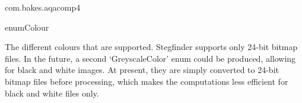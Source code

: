 \begin{texdocpackage}{com.bakes.aqacomp4}
\label{texdoclet:com.bakes.aqacomp4}

\begin{texdocclass}{enum}{Colour}
\label{texdoclet:com.bakes.aqacomp4.Colour}
\begin{texdocclassintro}
The different colours that are supported. Stegfinder supports only 24-bit
 bitmap files. In the future, a second `GreyscaleColor' enum could be produced,
 allowing for black and white images. At present, they are simply converted to
 24-bit bitmap files before processing, which makes the computations less efficient
 for black and white files only.\end{texdocclassintro}
\begin{texdocenums}
\end{texdocenums}
\begin{texdocclassmethods}
\end{texdocclassmethods}
\end{texdocclass}


\end{texdocpackage}



